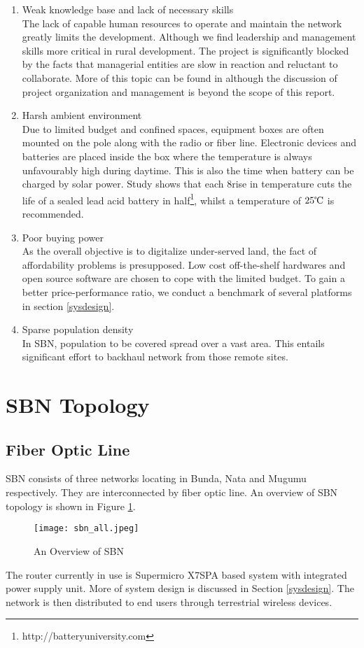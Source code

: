 \begin{enumerate}\label{challenges}
\item Weak knowledge base and lack of necessary skills\\
The lack of capable human resources to operate and maintain the network greatly limits the development. Although we find leadership and management skills more critical in rural development. The project is significantly blocked by the facts that managerial entities are slow in reaction and reluctant to collaborate. More of this topic can be found in \cite{nungu2011business} although the discussion of project organization and management is beyond the scope of this report.

\item Harsh ambient environment \\
Due to limited budget and confined spaces, equipment boxes are often mounted on the pole along with the radio or fiber line. Electronic devices and batteries are placed inside the box where the temperature is always unfavourably high during daytime. This is also the time when battery can be charged by solar power. Study shows that each 8\celsius rise in temperature cuts the life of a sealed lead acid battery in half\footnote{http://batteryuniversity.com}, whilst a temperature of $25\celsius$ is recommended.

\item Poor buying power \\
As the overall objective is to digitalize under-served land, the fact of affordability problems is presupposed. Low cost off-the-shelf hardwares and open source software are chosen to cope with the limited budget. To gain a better price-performance ratio, we conduct a benchmark of several platforms in section \ref{sysdesign}.

\item Sparse population density \\
In SBN, population to be covered spread over a vast area. This entails significant effort to backhaul network from those remote sites.
\end{enumerate}


\section{SBN Topology}\label{sbn_intro}
\subsection{Fiber Optic Line}
SBN consists of three networks locating in Bunda, Nata and Mugumu respectively. They are interconnected by fiber optic line. An overview of SBN topology is shown in Figure \ref{sbn_all}.
\begin{figure}[htbp]
\centering
\texttt{[image: sbn\_all.jpeg]}
\caption{An Overview of SBN}
\label{sbn_all}
\end{figure}
The router currently in use is Supermicro X7SPA based system with integrated power supply unit. More of system design is discussed in Section \ref{sysdesign}. The network is then distributed to end users through terrestrial wireless devices. 

